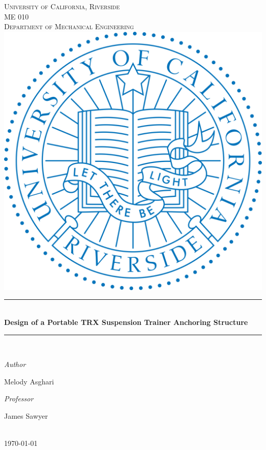 \newcommand{\HRule}{\rule{\linewidth}{0.5mm}} 

\begin{titlepage}
\center
\textsc{
\huge{University of California, Riverside}\\[.5cm]
\huge{ME 010 }\\[.5cm]
\Large
Department of Mechanical Engineering\\[1cm] 
\includegraphics{UCR-logo}\\[1cm]
}

\sffamily
\HRule \\[0.4cm]
\textbf{\Huge Design of a Portable TRX Suspension Trainer Anchoring Structure}\\[0.2cm] 
\HRule \\[2cm]
 
\large
\begin{minipage}[t]{.4\textwidth}
\begin{flushleft}
\emph{Author}

Melody Asghari
\end{flushleft}

\end{minipage}\hfill\begin{minipage}[t]{.4\textwidth}

\begin{flushright}
\emph{Professor} 

James Sawyer\\ 
\end{flushright}
\end{minipage}
\\[2cm]

{\today}\\[3cm]

\end{titlepage}


